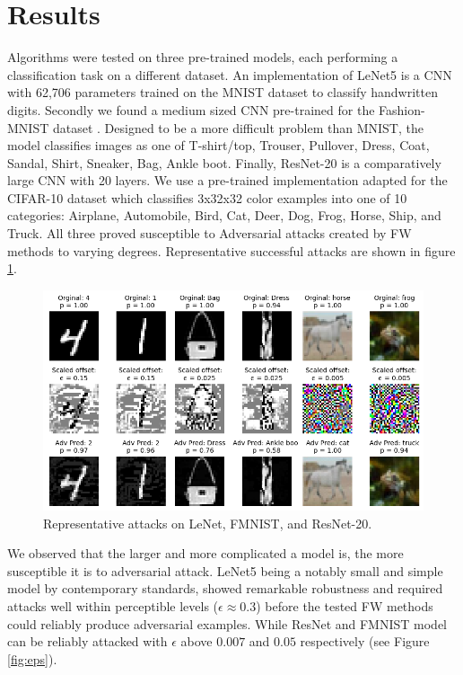 \documentclass{article}
\begin{document}
\section{Results}
Algorithms were tested on three pre-trained models, each performing a classification task on a different dataset. An implementation of LeNet5 \cite{lenet, lenet-mdl} is a CNN with 62,706 parameters trained on the MNIST dataset to classify handwritten digits. 
Secondly we found a medium sized CNN pre-trained for the Fashion-MNIST dataset \cite{fmnist, fmnist-mdl}. Designed to be a more difficult problem than MNIST, the model classifies images as one of T-shirt/top, Trouser, Pullover, Dress, Coat, Sandal, Shirt, Sneaker, Bag, Ankle boot. 
Finally, ResNet-20 \cite{resnet} is a comparatively large CNN with 20 layers. We use a pre-trained implementation adapted for the CIFAR-10 dataset \cite{cifar10} which classifies 3x32x32 color examples into one of 10 categories: Airplane, Automobile, Bird, Cat, Deer, Dog, Frog, Horse, Ship, and Truck. All three proved susceptible to Adversarial attacks created by FW methods to varying degrees. Representative successful attacks are shown in figure \ref{fig:adv_ex}.

\begin{figure}[H]
    \centering
    \includegraphics[width=\textwidth]{plots/adv_ex.png}
    \caption{Representative attacks on LeNet, FMNIST, and ResNet-20.}
    \label{fig:adv_ex}
\end{figure}

We observed that the larger and more complicated a model is, the more susceptible it is to adversarial attack. 
LeNet5 being a notably small and simple model by contemporary standards, showed remarkable robustness and required attacks well within perceptible levels ($\epsilon \approx 0.3$) before the tested FW methods could reliably produce adversarial examples. While ResNet and FMNIST model can be reliably attacked with $\epsilon$ above $0.007$ and $0.05$ respectively (see Figure \ref{fig:eps}).
\end{document}
